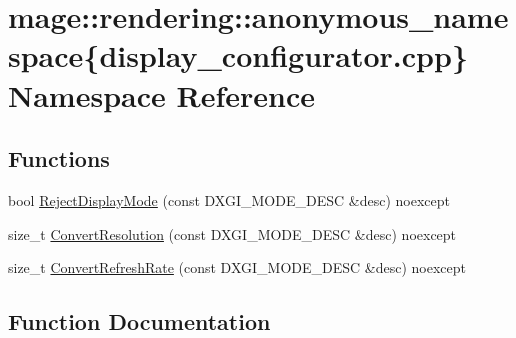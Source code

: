 \hypertarget{namespacemage_1_1rendering_1_1anonymous__namespace_02display__configurator_8cpp_03}{}\section{mage\+:\+:rendering\+:\+:anonymous\+\_\+namespace\{display\+\_\+configurator.\+cpp\} Namespace Reference}
\label{namespacemage_1_1rendering_1_1anonymous__namespace_02display__configurator_8cpp_03}
\subsection*{Functions}
\begin{DoxyCompactItemize}
\item 
bool \mbox{\hyperlink{namespacemage_1_1rendering_1_1anonymous__namespace_02display__configurator_8cpp_03_adcb562662bd203427f9c0fe08912e491}{Reject\+Display\+Mode}} (const D\+X\+G\+I\+\_\+\+M\+O\+D\+E\+\_\+\+D\+E\+SC \&desc) noexcept
\item 
size\+\_\+t \mbox{\hyperlink{namespacemage_1_1rendering_1_1anonymous__namespace_02display__configurator_8cpp_03_a8f0db6ae8408ec8ac391cff8e75e2955}{Convert\+Resolution}} (const D\+X\+G\+I\+\_\+\+M\+O\+D\+E\+\_\+\+D\+E\+SC \&desc) noexcept
\item 
size\+\_\+t \mbox{\hyperlink{namespacemage_1_1rendering_1_1anonymous__namespace_02display__configurator_8cpp_03_a10b621d54dad836a65cd8fb374121298}{Convert\+Refresh\+Rate}} (const D\+X\+G\+I\+\_\+\+M\+O\+D\+E\+\_\+\+D\+E\+SC \&desc) noexcept
\end{DoxyCompactItemize}


\subsection{Function Documentation}
\mbox{\label{namespacemage_1_1rendering_1_1anonymous__namespace_02display__configurator_8cpp_03_a10b621d54dad836a65cd8fb374121298}} 
